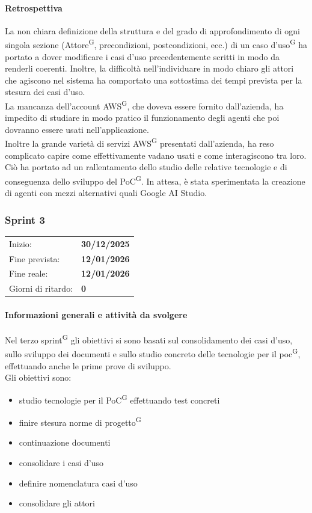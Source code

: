 \documentclass[a4paper, 11pt]{article}
\newcommand{\subsubsubsection}[1]{\paragraph{#1}}
\begin{document}
\subsubsubsection{Retrospettiva}
La non chiara definizione della struttura e del grado di approfondimento di ogni singola sezione (Attore\textsuperscript{G}, precondizioni, postcondizioni, ecc.) di un caso d'uso\textsuperscript{G} ha portato a dover modificare i casi d'uso precedentemente scritti in modo da renderli coerenti. Inoltre, la difficoltà nell'individuare in modo chiaro gli attori che agiscono nel sistema ha comportato una sottostima dei tempi prevista per la stesura dei casi d'uso. \\
La mancanza dell'account AWS\textsuperscript{G}, che doveva essere fornito dall'azienda, ha impedito di studiare in modo pratico il funzionamento degli agenti che poi dovranno essere usati nell'applicazione. \\
Inoltre la grande varietà di servizi AWS\textsuperscript{G} presentati dall'azienda, ha reso complicato capire come effettivamente vadano usati e come interagiscono tra loro.\\
Ciò ha portato ad un rallentamento dello studio delle relative tecnologie e di conseguenza dello sviluppo del PoC\textsuperscript{G}. In attesa, è stata sperimentata la creazione di agenti con mezzi alternativi quali Google AI Studio.






\newpage










\subsubsection{Sprint 3}
\begin{tabular}{ll}
Inizio: & \textbf{30/12/2025} \\
Fine prevista: & \textbf{12/01/2026} \\
Fine reale: & \textbf{12/01/2026} \\
Giorni di ritardo: & \textbf{0} \\
\end{tabular}


\subsubsubsection{Informazioni generali e attività da svolgere}
Nel terzo sprint\textsuperscript{G} gli obiettivi si sono basati sul consolidamento dei casi d'uso, sullo sviluppo dei documenti e sullo studio concreto delle tecnologie per il poc\textsuperscript{G}, effettuando anche le prime prove di sviluppo.\\
Gli obiettivi sono:
\begin{itemize}
  \item studio tecnologie per il PoC\textsuperscript{G} effettuando test concreti
  \item finire stesura norme di progetto\textsuperscript{G}
  \item continuazione documenti
  \item consolidare i casi d'uso
  \item definire nomenclatura casi d'uso
  \item consolidare gli attori
\end{itemize}
\end{document}

